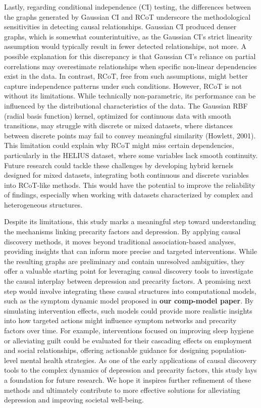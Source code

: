 \documentclass[
]{article}
\begin{document}
Lastly, regarding conditional independence (CI) testing, the differences
between the graphs generated by Gaussian CI and RCoT underscore the
methodological sensitivities in detecting causal relationships. Gaussian
CI produced denser graphs, which is somewhat counterintuitive, as the
Gaussian CI's strict linearity assumption would typically result in
fewer detected relationships, not more. A possible explanation for this
discrepancy is that Gaussian CI's reliance on partial correlations may
overestimate relationships when specific non-linear dependencies exist
in the data. In contrast, RCoT, free from such assumptions, might better
capture independence patterns under such conditions. However, RCoT is
not without its limitations. While technically non-parametric, its
performance can be influenced by the distributional characteristics of
the data. The Gaussian RBF (radial basis function) kernel, optimized for
continuous data with smooth transitions, may struggle with discrete or
mixed datasets, where distances between discrete points may fail to
convey meaningful similarity (Howlett, 2001). This limitation could
explain why RCoT might miss certain dependencies, particularly in the
HELIUS dataset, where some variables lack smooth continuity. Future
research could tackle these challenges by developing hybrid kernels
designed for mixed datasets, integrating both continuous and discrete
variables into RCoT-like methods. This would have the potential to
improve the reliability of findings, especially when working with
datasets characterized by complex and heterogeneous structures.

Despite its limitations, this study marks a meaningful step toward
understanding the mechanisms linking precarity factors and depression.
By applying causal discovery methods, it moves beyond traditional
association-based analyses, providing insights that can inform more
precise and targeted interventions. While the resulting graphs are
preliminary and contain unresolved ambiguities, they offer a valuable
starting point for leveraging causal discovery tools to investigate the
causal interplay between depression and precarity factors. A promising
next step would involve integrating these causal structures into
computational models, such as the symptom dynamic model proposed in
\textbf{our comp-model paper}. By simulating intervention effects, such
models could provide more realistic insights into how targeted actions
might influence symptom networks and precarity factors over time. For
example, interventions focused on improving sleep hygiene or alleviating
guilt could be evaluated for their cascading effects on employment and
social relationships, offering actionable guidance for designing
population-level mental health strategies. As one of the early
applications of causal discovery tools to the complex dynamics of
depression and precarity factors, this study lays a foundation for
future research. We hope it inspires further refinement of these methods
and ultimately contribute to more effective solutions for alleviating
depression and improving societal well-being.
\end{document}

